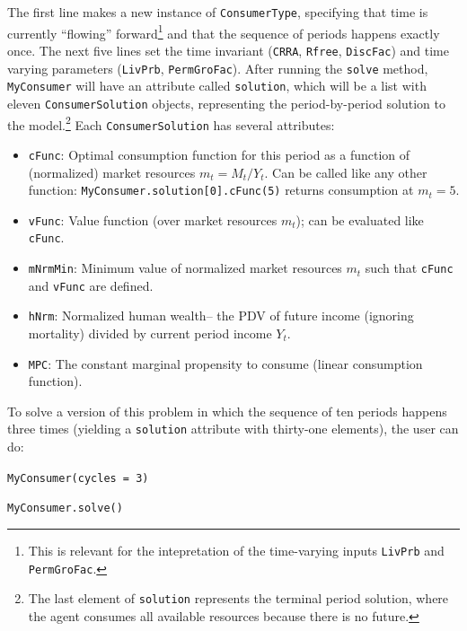 \documentclass[12pt,titlepage,letterpaper]{econtex}
\begin{document}
The first line makes a new instance of \texttt{ConsumerType}, specifying that time is currently ``flowing'' forward\footnote{This is relevant for the intepretation of the time-varying inputs \texttt{LivPrb} and \texttt{PermGroFac}.} and that the sequence of periods happens exactly once.  The next five lines set the time invariant (\texttt{CRRA}, \texttt{Rfree}, \texttt{DiscFac}) and time varying parameters (\texttt{LivPrb}, \texttt{PermGroFac}).  After running the \texttt{solve} method, \texttt{MyConsumer} will have an attribute called \texttt{solution}, which will be a list with eleven \texttt{ConsumerSolution} objects, representing the period-by-period solution to the model.\footnote{The last element of \texttt{solution} represents the terminal period solution, where the agent consumes all available resources because there is no future.}  Each \texttt{ConsumerSolution} has several attributes:
\begin{itemize}
\item \texttt{cFunc}: Optimal consumption function for this period as a function of (normalized) market resources $m_t = M_t/Y_t$. Can be called like any other function: \texttt{MyConsumer.solution[0].cFunc(5)} returns consumption at $m_t = 5$.

\item \texttt{vFunc}: Value function (over market resources $m_t$); can be evaluated like \texttt{cFunc}.

\item \texttt{mNrmMin}: Minimum value of normalized market resources $m_t$ such that \texttt{cFunc} and \texttt{vFunc} are defined. 

\item \texttt{hNrm}: Normalized human wealth-- the PDV of future income (ignoring mortality) divided by current period income $Y_t$.

\item \texttt{MPC}: The constant marginal propensity to consume (linear consumption function).

\end{itemize}

To solve a version of this problem in which the sequence of ten periods happens three times (yielding a \texttt{solution} attribute with thirty-one elements), the user can do:

\vspace{0.25cm}

\noindent \texttt{MyConsumer(cycles = 3)}

\noindent \texttt{MyConsumer.solve()}
\end{document}
